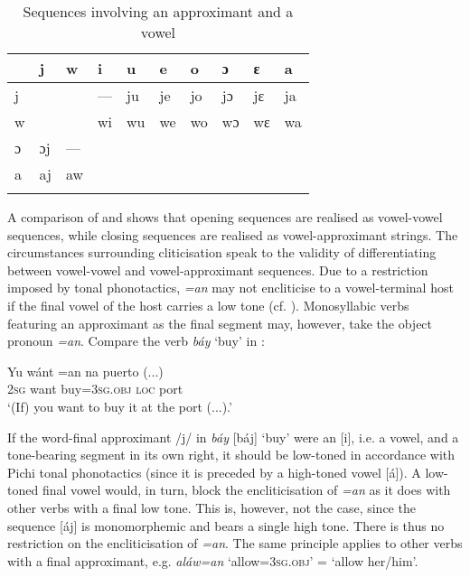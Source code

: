 \begin{table}
\caption{Sequences involving an approximant and a vowel}
\label{tab:key:2.10}

\begin{tabularx}{\textwidth}{XXXXXXXXXX}
\lsptoprule
 & j & w & i & u & e & o & ɔ & ɛ & a\\
\midrule 
j &  &  & {}--- & ju & je & jo & jɔ & jɛ & ja\\
w &  &  & wi & wu & we & wo & wɔ & wɛ & wa\\
ɔ & ɔj & {}--- &  &  &  &  &  &  & \\
a & aj & aw &  &  &  &  &  &  & \\
\lspbottomrule
\end{tabularx}
\end{table}
A comparison of  and  shows that opening sequences are realised as vowel-vowel sequences, while closing sequences are realised as vowel-approximant strings. The circumstances surrounding cliticisation speak to the validity of differentiating between vowel-vowel and vowel-approximant sequences. Due to a restriction imposed by tonal phonotactics, \textit{=an} may not encliticise to a vowel-terminal host if the final vowel of the host carries a low tone (cf. ). Monosyllabic verbs featuring an approximant as the final segment may, however, take the object pronoun \textit{=an}. Compare the verb \textit{báy} ‘buy’ in : 

\ea%
    \label{ex:key:41}
    \gll   Yu  wánt  =an    na  puerto  (...)\\
\textsc{2sg}  want  buy=\textsc{3sg.obj}  \textsc{loc}  port\\
\glt  ‘(If) you want to buy it at the port (...).’ 
\z

If the word-final approximant /j/ in \textit{báy} [báj] ‘buy’ were an [i], i.e. a vowel, and a tone-bearing segment in its own right, it should be low-toned in accordance with Pichi tonal phonotactics (since it is preceded by a high-toned vowel [á]). A low-toned final vowel would, in turn, block the encliticisation of \textit{=an} as it does with other verbs with a final low tone. This is, however, not the case, since the sequence [áj] is monomorphemic and bears a single high tone. There is thus no restriction on the encliticisation of \textit{=an}. The same principle applies to other verbs with a final approximant, e.g. \textit{aláw=an} ‘allow=\textsc{3sg.obj}’ = ‘allow her/him’.


